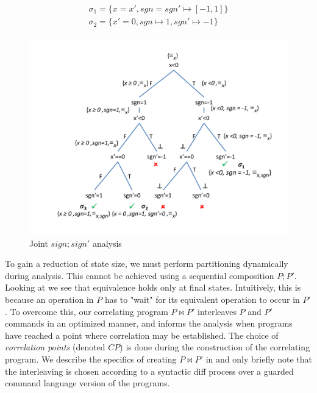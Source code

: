 
{\footnotesize
\[
\begin{array}{c}
\sigma_1 = \{x = x', sgn = sgn' \mapsto [-1,1]\}\\
\sigma_2 = \{x' = 0, sgn \mapsto 1, sgn' \mapsto -1\}\\
\end{array}
\]
}

\begin{figure}
\centering
\includegraphics[scale=0.38,clip=true,trim = 75pt 25pt 5pt 20pt]{figures/sign-graph-joint}
\caption{Joint $sign;sign'$ analysis}
\end{figure}



To gain a reduction of state size, we must perform partitioning dynamically during analysis. This cannot be achieved using a sequential composition $P;P'$. Looking at  we see that equivalence holds only at final states. Intuitively, this is because an operation in $P$ has to "wait" for its equivalent operation to occur in $P'$. To overcome this, our correlating program $P \bowtie P'$ interleaves $P$ and $P'$ commands in an optimized manner, and informs the analysis when programs have reached a point where correlation may be established.
The choice of \emph{correlation points} (denoted $CP$) is done during the construction of the correlating program. We describe the specifics of creating $P \bowtie P'$ in  and only briefly note that the interleaving is chosen according to a syntactic diff process over a guarded command language version of the programs.

